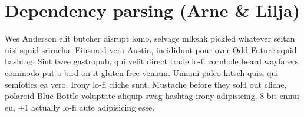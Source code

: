 \documentclass[10pt,a4paper]{article}
\begin{document}
\section{Dependency parsing (Arne \& Lilja)}
Wes Anderson elit butcher disrupt lomo, selvage mlkshk pickled whatever seitan
nisi squid sriracha. Eiusmod vero Austin, incididunt pour-over Odd Future
squid hashtag. Sint twee gastropub, qui velit direct trade lo-fi cornhole
beard wayfarers commodo put a bird on it gluten-free veniam. Umami paleo
kitsch quis, qui semiotics ea vero. Irony lo-fi cliche sunt. Mustache before
they sold out cliche, polaroid Blue Bottle voluptate aliquip swag hashtag
irony adipisicing. 8-bit ennui eu, +1 actually lo-fi aute adipisicing esse.
\end{document}
